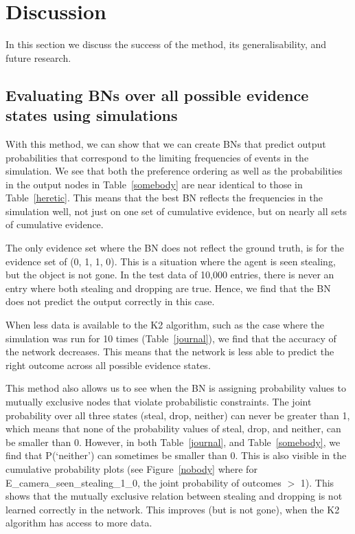 \documentclass[11pt]{article}
\begin{document}
\newpage



\section{Discussion}
In this section we discuss the success of the method, its generalisability, and future research.


\subsection{Evaluating BNs over all possible evidence states using simulations}
With this method, we can show that we can create BNs that predict output probabilities that correspond to the limiting frequencies of events in the simulation. We see that both the preference ordering as well as the probabilities in the output nodes in Table~\ref{somebody} are near identical to those in Table~\ref{heretic}. This means that the best BN reflects the frequencies in the simulation well, not just on one set of cumulative evidence, but on nearly all sets of cumulative evidence. 

The only evidence set where the BN does not reflect the ground truth, is for the evidence set of (0, 1, 1, 0). This is a situation where the agent is seen stealing, but the object is not gone. In the test data of 10,000 entries, there is never an entry where both stealing and dropping are true. Hence, we find that the BN does not predict the output correctly in this case. 

When less data is available to the K2 algorithm, such as the case where the simulation was run for 10 times (Table~\ref{journal}), we find that the accuracy of the network decreases. This means that the network is less able to predict the right outcome across all possible evidence states.

This method also allows us to see when the BN is assigning probability values to mutually exclusive nodes that violate probabilistic constraints. The joint probability over all three states (steal, drop, neither) can never be greater than 1, which means that none of the probability values of steal, drop, and neither, can be smaller than 0. However, in both Table~\ref{journal}, and Table~\ref{somebody}, we find that P(`neither') can sometimes be smaller than 0. This is also visible in the cumulative probability plots (see Figure~\ref{nobody} where for E\_camera\_seen\_stealing\_1\_0, the joint probability of outcomes $>$ 1). This shows that the mutually exclusive relation between stealing and dropping is not learned correctly in the network. This improves (but is not gone), when the K2 algorithm has access to more data.
\end{document}
